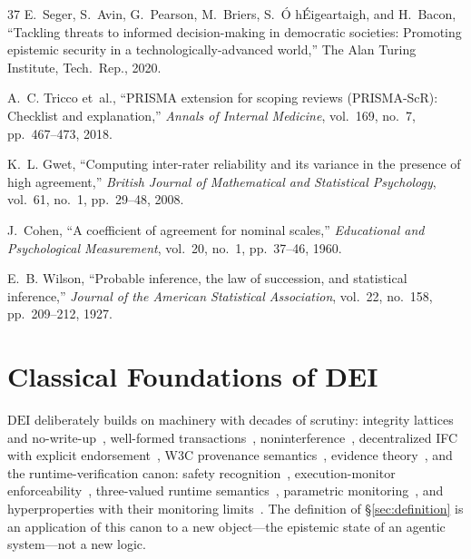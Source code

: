 \documentclass[conference]{IEEEtran}
\newcommand{\DEI}{\ensuremath{\mathrm{DEI}}}
\begin{document}
\begin{thebibliography}{37}
 E.~Seger, S.~Avin, G.~Pearson, M.~Briers,
S.~\'O h\'Eigeartaigh, and H.~Bacon, ``Tackling threats to
informed decision-making in democratic societies: Promoting
epistemic security in a technologically-advanced world,'' The Alan
Turing Institute, Tech.\ Rep., 2020.

 A.~C. Tricco et~al., ``PRISMA extension for
scoping reviews (PRISMA-ScR): Checklist and explanation,''
\emph{Annals of Internal Medicine}, vol.~169, no.~7,
pp.~467--473, 2018.

 K.~L. Gwet, ``Computing inter-rater reliability and
its variance in the presence of high agreement,'' \emph{British
Journal of Mathematical and Statistical Psychology}, vol.~61,
no.~1, pp.~29--48, 2008.

 J.~Cohen, ``A coefficient of agreement for nominal
scales,'' \emph{Educational and Psychological Measurement},
vol.~20, no.~1, pp.~37--46, 1960.

 E.~B. Wilson, ``Probable inference, the law of
succession, and statistical inference,'' \emph{Journal of the
American Statistical Association}, vol.~22, no.~158,
pp.~209--212, 1927.

\end{thebibliography}

\appendices

\section{Classical Foundations of DEI}
\label{app:foundations}
\DEI{} deliberately builds on machinery with decades of scrutiny:
integrity lattices and no-write-up~\cite{biba,denning}, well-formed
transactions~\cite{clarkwilson}, noninterference~\cite{goguen},
decentralized IFC with explicit endorsement~\cite{myersliskov},
W3C provenance semantics~\cite{prov}, evidence
theory~\cite{shafer,dung}, and the runtime-verification canon:
safety recognition~\cite{alpern}, execution-monitor
enforceability~\cite{schneider}, three-valued runtime
semantics~\cite{bauer,pnueli}, parametric monitoring~\cite{mop},
and hyperproperties with their monitoring
limits~\cite{hyperprops,finkbeiner,stucki}. The definition of
\S\ref{sec:definition} is an application of this canon to a new
object---the epistemic state of an agentic system---not a new
logic.
\end{document}
